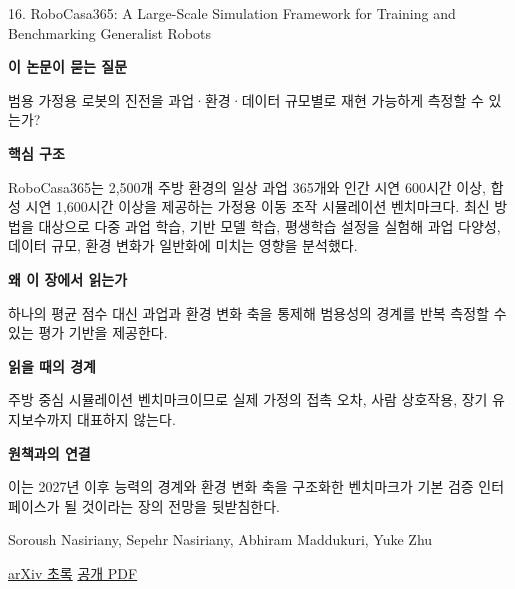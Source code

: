 \documentclass[11pt,openany]{book}
\begin{document}
\begin{termcard}{16. RoboCasa365: A Large-Scale Simulation Framework for Training and Benchmarking Generalist Robots}

\par

\medskip

{\sffamily\bfseries\color{deepblue} 이 논문이 묻는 질문}\par

범용 가정용 로봇의 진전을 과업·환경·데이터 규모별로 재현 가능하게 측정할 수 있는가?

\smallskip

{\sffamily\bfseries\color{deepblue} 핵심 구조}\par

RoboCasa365는 2,500개 주방 환경의 일상 과업 365개와 인간 시연 600시간 이상, 합성 시연 1,600시간 이상을 제공하는 가정용 이동 조작 시뮬레이션 벤치마크다. 최신 방법을 대상으로 다중 과업 학습, 기반 모델 학습, 평생학습 설정을 실험해 과업 다양성, 데이터 규모, 환경 변화가 일반화에 미치는 영향을 분석했다.

\smallskip

{\sffamily\bfseries\color{deepblue} 왜 이 장에서 읽는가}\par

하나의 평균 점수 대신 과업과 환경 변화 축을 통제해 범용성의 경계를 반복 측정할 수 있는 평가 기반을 제공한다.

\smallskip

{\sffamily\bfseries\color{coral} 읽을 때의 경계}\par

주방 중심 시뮬레이션 벤치마크이므로 실제 가정의 접촉 오차, 사람 상호작용, 장기 유지보수까지 대표하지 않는다.

\smallskip

{\sffamily\bfseries\color{teal} 원책과의 연결}\par

이는 2027년 이후 능력의 경계와 환경 변화 축을 구조화한 벤치마크가 기본 검증 인터페이스가 될 것이라는 장의 전망을 뒷받침한다.

\medskip

{\footnotesize\color{muted} Soroush Nasiriany, Sepehr Nasiriany, Abhiram Maddukuri, Yuke Zhu\par

\href{https://arxiv.org/abs/2603.04356}{arXiv 초록} \quad \href{https://arxiv.org/pdf/2603.04356}{공개 PDF}\par}

\end{termcard}
\end{document}
